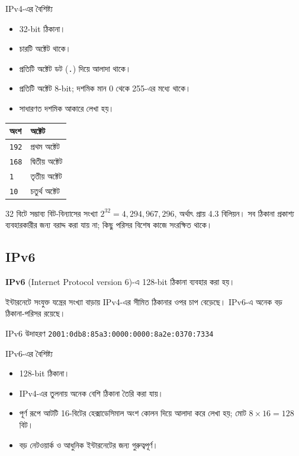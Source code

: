 \begin{keypointbox}{IPv4-এর বৈশিষ্ট্য}
\begin{itemize}
\item 32-bit ঠিকানা।
\item চারটি অক্টেট থাকে।
\item প্রতিটি অক্টেট ডট (\texttt{.}) দিয়ে আলাদা থাকে।
\item প্রতিটি অক্টেট 8-bit; দশমিক মান 0 থেকে 255-এর মধ্যে থাকে।
\item সাধারণত দশমিক আকারে লেখা হয়।
\end{itemize}
\end{keypointbox}

\begin{center}
\begin{tabular}{|p{}|p{}|}
\hline
\textbf{অংশ} & \textbf{অক্টেট} \\
\hline
\texttt{192} & প্রথম অক্টেট \\
\hline
\texttt{168} & দ্বিতীয় অক্টেট \\
\hline
\texttt{1} & তৃতীয় অক্টেট \\
\hline
\texttt{10} & চতুর্থ অক্টেট \\
\hline
\end{tabular}
\end{center}

32 বিটে সম্ভাব্য বিট-বিন্যাসের সংখ্যা $2^{32}=4,294,967,296$, অর্থাৎ প্রায় 4.3 বিলিয়ন। সব ঠিকানা প্রকাশ্য ব্যবহারকারীর জন্য বরাদ্দ করা যায় না; কিছু পরিসর বিশেষ কাজে সংরক্ষিত থাকে।

\subsection{IPv6}

\begin{definitionbox}{}
\textbf{IPv6} (Internet Protocol version 6)-এ 128-bit ঠিকানা ব্যবহার করা হয়।
\end{definitionbox}

ইন্টারনেটে সংযুক্ত যন্ত্রের সংখ্যা বাড়ায় IPv4-এর সীমিত ঠিকানার ওপর চাপ বেড়েছে। IPv6-এ অনেক বড় ঠিকানা-পরিসর রয়েছে।

\begin{examplebox}{IPv6 উদাহরণ}
\texttt{2001:0db8:85a3:0000:0000:8a2e:0370:7334}
\end{examplebox}

\begin{keypointbox}{IPv6-এর বৈশিষ্ট্য}
\begin{itemize}
\item 128-bit ঠিকানা।
\item IPv4-এর তুলনায় অনেক বেশি ঠিকানা তৈরি করা যায়।
\item পূর্ণ রূপে আটটি 16-বিটের হেক্সাডেসিমাল অংশ কোলন দিয়ে আলাদা করে লেখা হয়; মোট $8\times16=128$ বিট।
\item বড় নেটওয়ার্ক ও আধুনিক ইন্টারনেটের জন্য গুরুত্বপূর্ণ।
\end{itemize}
\end{keypointbox}

